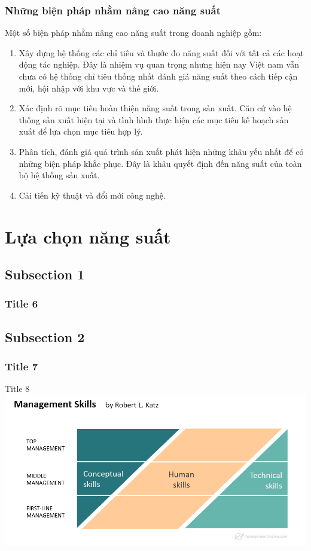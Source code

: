 \documentclass[10pt]{beamer}
\begin{document}
\begin{frame}
\transsplitverticalout
\frametitle{Những biện pháp nhằm nâng cao năng suất}
Một số biện pháp nhằm nâng cao năng suất trong doanh nghiệp gồm: 
\begin{enumerate}
\item Xây dựng hệ thống các chỉ tiêu và thước đo năng suất đối với tất cả các hoạt động tác
nghiệp. Đây là nhiệm vụ quan trọng nhưng hiện nay Việt nam vẫn chưa có hệ thống chỉ tiêu
thống nhất đánh giá năng suất theo cách tiếp cận mới, hội nhập với khu vực và thế giới.
\item Xác định rõ mục tiêu hoàn thiện năng suất trong sản xuất. Căn cứ vào hệ thống sản
xuất hiện tại và tình hình thực hiện các mục tiêu kế hoạch sản xuất để lựa chọn mục tiêu hợp lý.
\item Phân tích, đánh giá quá trình sản xuất phát hiện những khâu yếu nhất để có những biện pháp khắc phục. Đây là khâu quyết định đến năng suất của toàn bộ hệ thống
sản xuất.
\item Cải tiến kỹ thuật và đổi mới công nghệ.
\end{enumerate}

\end{frame}

\section{Lựa chọn năng suất}

\subsection{Subsection 1}
\begin{frame}
\transsplitverticalout
\frametitle{Title 6}





\end{frame}


\subsection{Subsection 2}
\begin{frame}
\transblindshorizontal
\pause
\frametitle{Title 7}

\end{frame}

\begin{frame}{Title 8}
\transsplitverticalin
\centering
\includegraphics[scale=0.4]{Figs/fig6}
\end{frame}
\end{document}
